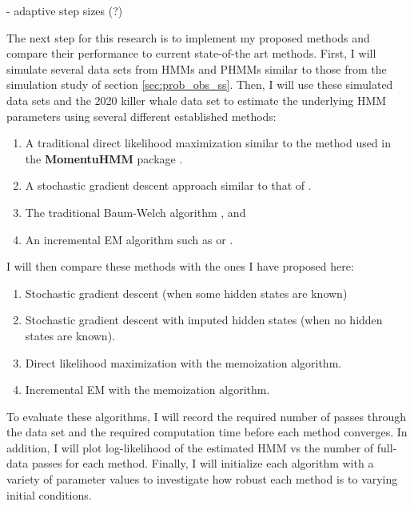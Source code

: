 
%

- adaptive step sizes (?)

The next step for this research is to implement my proposed methods and compare their performance to current state-of-the art methods. First, I will simulate several data sets from HMMs and PHMMs similar to those from the simulation study of section \ref{sec:prob_obs_ss}. Then, I will use these simulated data sets and the 2020 killer whale data set to estimate the underlying HMM parameters using several different established methods:

\begin{enumerate}
    \item A traditional direct likelihood maximization similar to the method used in the \textbf{MomentuHMM} package \citep{Blackwell:2016}.
    \item A stochastic gradient descent approach similar to that of \citet{Ye:2017}.
    \item The traditional Baum-Welch algorithm \citep{Baum:1970}, and
    \item An incremental EM algorithm such as \citet{Gotoh:1998} or \citet{Florez:2005}.
\end{enumerate}
%
I will then compare these methods with the ones I have proposed here:
%
\begin{enumerate}
    \item Stochastic gradient descent (when some hidden states are known)
    \item Stochastic gradient descent with imputed hidden states (when no hidden states are known).
    \item Direct likelihood maximization with the memoization algorithm.
    \item Incremental EM with the memoization algorithm.
\end{enumerate}

To evaluate these algorithms, I will record the required number of passes through the data set and the required computation time before each method converges. In addition, I will plot log-likelihood of the estimated HMM vs the number of full-data passes for each method. Finally, I will initialize each algorithm with a variety of parameter values to investigate how robust each method is to varying initial conditions.

